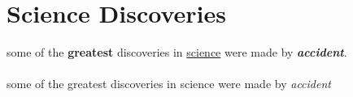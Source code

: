 \documentclass{article}
\begin{document}
	\section{Science Discoveries}
	some of the \textbf{greatest}
	discoveries in \underline{science}
	were made by
	\textbf{\textit{accident}}.
	
	\paragraph{}
	some of the greatest discoveries in science were made by \emph{accident}
\end{document}
